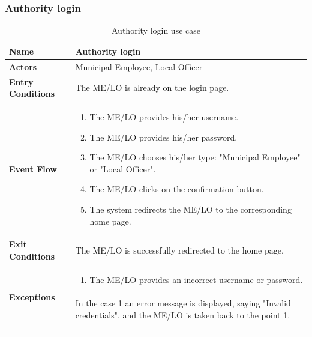 					\subsubsection{Authority login}
					\begin{table}[!h]
						\centering
						\vspace{-4mm}
						\begin{tabular}{lp{}}
							\toprule
							\textbf{Name} & \textbf{Authority login} \\[1mm]
							\midrule
							\textbf{Actors} & Municipal Employee, Local Officer \\[1mm]
							\textbf{Entry Conditions} & The ME/LO is already on the login page. \vspace{1mm}\\
							\textbf{Event Flow} &
							\vspace{-5mm} 
							\begin{enumerate}[noitemsep]
								\item The ME/LO provides his/her username.
								\item The ME/LO provides his/her password.
								\item The ME/LO chooses his/her type: "Municipal Employee" or "Local Officer".
								\item The ME/LO clicks on the confirmation button.
								\item The system redirects the ME/LO to the corresponding home page.
							\end{enumerate} \\
							\textbf{Exit Conditions} & The ME/LO is successfully redirected to the home page. \vspace{2mm}\\
							\textbf{Exceptions} &
							\vspace{-5mm} 
							\begin{enumerate}
								\item The ME/LO provides an incorrect username or password.
							\end{enumerate}
							\vspace{-7mm}
							\paragraph{}
								In the case 1 an error message is displayed, saying "Invalid credentials", and the ME/LO is taken back to the point 1. \\
							\bottomrule
						\end{tabular}
						\caption{Authority login use case}
					\end{table}
					\vspace{-7mm}
